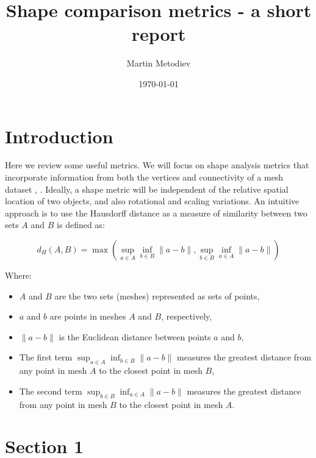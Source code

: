 \documentclass[11pt]{article}
\title{Shape comparison metrics - a short report}
\author{Martin Metodiev}
\date{\today}
\begin{document}
\maketitle	




\section{Introduction}

Here we review some useful metrics. We will focus on shape analysis metrics that incorporate information from both the vertices and connectivity of a mesh dataset \cite{shapedna}, \cite{hyp_w}. Ideally, a shape metric will be independent of the relative spatial location of two objects, and also rotational and scaling variations. An intuitive approach is to use the Hausdorff distance as a measure of similarity between two sets \( A \) and \( B \) is defined as:

\[
d_H(A, B) = \max \left( \sup_{a \in A} \inf_{b \in B} \| a - b \|, \sup_{b \in B} \inf_{a \in A} \| a - b \| \right)
\]

Where:
\begin{itemize}
    \item \( A \) and \( B \) are the two sets (meshes) represented as sets of points,
    \item \( a \) and \( b \) are points in meshes \( A \) and \( B \), respectively,
    \item \( \| a - b \| \) is the Euclidean distance between points \( a \) and \( b \),
    \item The first term \( \sup_{a \in A} \inf_{b \in B} \| a - b \| \) measures the greatest distance from any point in mesh \( A \) to the closest point in mesh \( B \),
    \item The second term \( \sup_{b \in B} \inf_{a \in A} \| a - b \| \) measures the greatest distance from any point in mesh \( B \) to the closest point in mesh \( A \).
\end{itemize}


\pagebreak
\section{Section 1}
\end{document}
